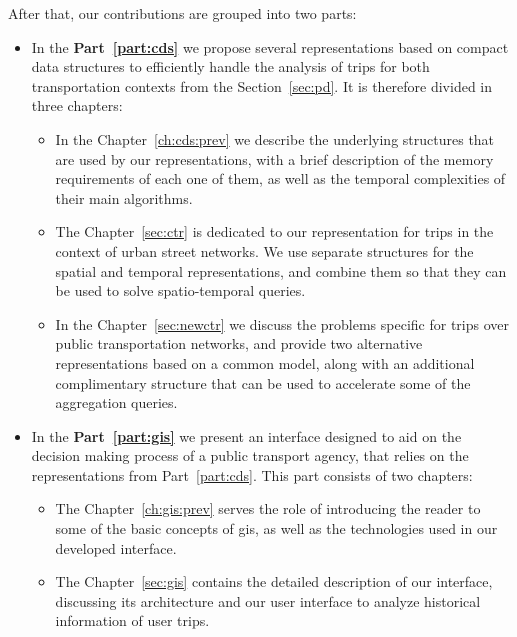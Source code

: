 \documentclass[a4paper,10pt,twoside]{book}
\begin{document}
	After that, our contributions are grouped into two parts:
	
	\begin{itemize}
	    \item In the \textbf{Part~\ref{part:cds}} we propose several representations based on compact data structures to efficiently handle the analysis of trips for both transportation contexts from the Section~\ref{sec:pd}. It is therefore divided in three chapters:
	    
	    \begin{itemize}
	        \item In the Chapter~\ref{ch:cds:prev} we describe the underlying structures that are used by our representations, with a brief description of the memory requirements of each one of them, as well as the temporal complexities of their main algorithms.
	        
	        \item The Chapter~\ref{sec:ctr} is dedicated to our representation for trips in the context of urban street networks. We use separate structures for the spatial and temporal representations, and combine them so that they can be used to solve spatio-temporal queries.
	        
	        \item In the Chapter~\ref{sec:newctr} we discuss the problems specific for trips over public transportation networks, and provide two alternative representations based on a common model, along with an additional complimentary structure that can be used to accelerate some of the aggregation queries.
	    \end{itemize}
	    
	    \item In the \textbf{Part~\ref{part:gis}} we present an interface designed to aid on the decision making process of a public transport agency, that relies on the representations from Part~\ref{part:cds}. This part consists of two chapters:
	    
	    \begin{itemize}
	        \item The Chapter~\ref{ch:gis:prev} serves the role of introducing the reader to some of the basic concepts of \gls{gis}, as well as the technologies used in our developed interface.
	        
	        \item The Chapter~\ref{sec:gis} contains the detailed description of our interface, discussing its architecture and our user interface to analyze historical information of user trips.
	    \end{itemize}
	\end{itemize}
	
\end{document}
